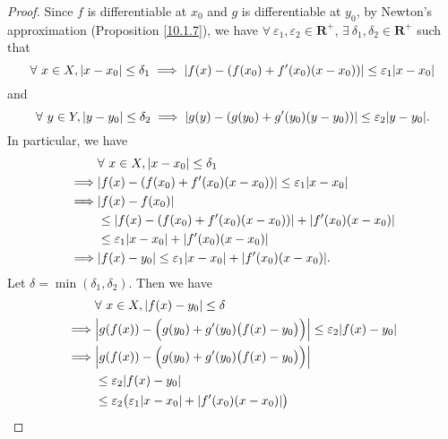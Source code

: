 \begin{proof}
    Since \(f\) is differentiable at \(x_0\) and \(g\) is differentiable at \(y_0\), by Newton's approximation (Proposition \ref{10.1.7}), we have \(\forall\ \varepsilon_1, \varepsilon_2 \in \mathbf{R}^+\), \(\exists\ \delta_1, \delta_2 \in \mathbf{R}^+\) such that
    \[
        \forall\ x \in X, \abs*{x - x_0} \leq \delta_1 \implies \abs*{f(x) - (f(x_0) + f'(x_0)(x - x_0))} \leq \varepsilon_1 \abs*{x - x_0}
    \]
    and
    \[
        \forall\ y \in Y, \abs*{y - y_0} \leq \delta_2 \implies \abs*{g(y) - (g(y_0) + g'(y_0)(y - y_0))} \leq \varepsilon_2 \abs*{y - y_0}.
    \]
    In particular, we have
    \begin{align*}
                 & \forall\ x \in X, \abs*{x - x_0} \leq \delta_1                                 \\
        \implies & \abs*{f(x) - (f(x_0) + f'(x_0)(x - x_0))} \leq \varepsilon_1 \abs*{x - x_0}    \\
        \implies & \abs*{f(x) - f(x_0)}                                                           \\
                 & \leq \abs*{f(x) - (f(x_0) + f'(x_0)(x - x_0))} + \abs*{f'(x_0)(x - x_0)}       \\
                 & \leq \varepsilon_1 \abs*{x - x_0} + \abs*{f'(x_0)(x - x_0)}                    \\
        \implies & \abs*{f(x) - y_0} \leq \varepsilon_1 \abs*{x - x_0} + \abs*{f'(x_0)(x - x_0)}.
    \end{align*}
    Let \(\delta = \min(\delta_1, \delta_2)\).
    Then we have
    \begin{align*}
                 & \forall\ x \in X, \abs*{f(x) - y_0} \leq \delta                                                                        \\
        \implies & \abs*{g(f(x)) - \Big(g(y_0) + g'(y_0)\big(f(x) - y_0\big)\Big)} \leq \varepsilon_2 \abs*{f(x) - y_0}                   \\
        \implies & \abs*{g(f(x)) - \Big(g(y_0) + g'(y_0)\big(f(x) - y_0\big)\Big)}                                                        \\
                 & \leq \varepsilon_2 \abs*{f(x) - y_0}                                                                                   \\
                 & \leq \varepsilon_2 \big(\varepsilon_1 \abs*{x - x_0} + \abs*{f'(x_0)(x - x_0)}\big)                                    \\

\end{align*}
\end{proof}
